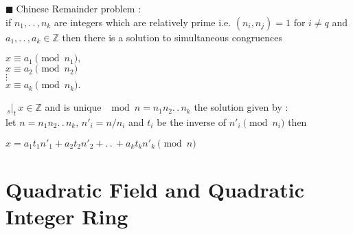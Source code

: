 \documentclass[11pt]{extarticle}
\newcommand{\Z}{\mathbb{Z}}
\newcommand{\w}[1]{\text{#1}}
\newcommand{\ck}{.\,.\,}
\newcommand{\st}{\,{}_{s}|_t\,}
\newcommand{\y}{$\blacksquare\;$}
\begin{document}
\begin{multicols}{2}
{	\y Chinese Remainder problem : \\
	if $ n_1,\ck ,n_k $ are integers which are relatively prime i.e. $ (n_i,n_j)=1 \w{ for } i\neq q$
	and $ a_1,\ck , a_k \in \Z $  then there is a solution to simultaneous congruences 
	\begin{center}
		$ x\equiv a_1 \pmod{n_1},$\\
		$x\equiv a_2\pmod{n_2} $\\
		$\vdots$\\
		$ x\equiv a_k\pmod{n_k}  .$
	\end{center} $ \st x\in \Z $ and is unique $ \mod n=n_1n_2\ck n_k $
	the solution given by :\\
	let $n=n_1n_2\ck n_k , \, n'_i=n/n_i$ and $ t_i $  be the inverse of $ n'_i \pmod{n_i }$ then
	\begin{center}
		$ x=a_1t_1n'_1+a_2t_2n'_2+\ck +a_kt_kn'_k \pmod n $
	\end{center}
} 

		\section{\normalsize  Quadratic Field and Quadratic Integer Ring}


\end{multicols}
\end{document}
